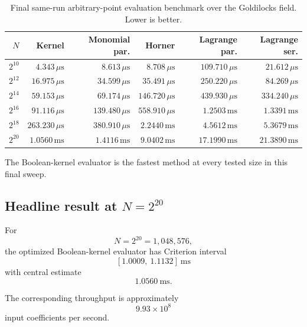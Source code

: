 \begin{table}[ht]
\centering
\small
\begin{tabular}{rrrrrr}
\toprule
\(N\) &
Kernel &
Monomial par. &
Horner &
Lagrange par. &
Lagrange ser. \\
\midrule
\(2^{10}\) &
\(4.343\,\mu\mathrm{s}\) &
\(8.613\,\mu\mathrm{s}\) &
\(8.708\,\mu\mathrm{s}\) &
\(109.710\,\mu\mathrm{s}\) &
\(21.612\,\mu\mathrm{s}\) \\

\(2^{12}\) &
\(16.975\,\mu\mathrm{s}\) &
\(34.599\,\mu\mathrm{s}\) &
\(35.491\,\mu\mathrm{s}\) &
\(250.220\,\mu\mathrm{s}\) &
\(84.269\,\mu\mathrm{s}\) \\

\(2^{14}\) &
\(59.153\,\mu\mathrm{s}\) &
\(69.174\,\mu\mathrm{s}\) &
\(146.720\,\mu\mathrm{s}\) &
\(439.930\,\mu\mathrm{s}\) &
\(334.240\,\mu\mathrm{s}\) \\

\(2^{16}\) &
\(91.116\,\mu\mathrm{s}\) &
\(139.480\,\mu\mathrm{s}\) &
\(558.910\,\mu\mathrm{s}\) &
\(1.2503\,\mathrm{ms}\) &
\(1.3391\,\mathrm{ms}\) \\

\(2^{18}\) &
\(263.230\,\mu\mathrm{s}\) &
\(380.910\,\mu\mathrm{s}\) &
\(2.2440\,\mathrm{ms}\) &
\(4.5612\,\mathrm{ms}\) &
\(5.3679\,\mathrm{ms}\) \\

\(2^{20}\) &
\(1.0560\,\mathrm{ms}\) &
\(1.4116\,\mathrm{ms}\) &
\(9.0402\,\mathrm{ms}\) &
\(17.1990\,\mathrm{ms}\) &
\(21.3890\,\mathrm{ms}\) \\
\bottomrule
\end{tabular}
\caption{Final same-run arbitrary-point evaluation benchmark over the
Goldilocks field. Lower is better.}
\label{tab:final-basis-results}
\end{table}

The Boolean-kernel evaluator is the fastest method at every tested size in
this final sweep.

\subsection{Headline result at \(N=2^{20}\)}

For
\[
N=2^{20}=1{,}048{,}576,
\]
the optimized Boolean-kernel evaluator has Criterion interval
\[
[1.0009,\ 1.1132]\ \mathrm{ms}
\]
with central estimate
\[
\boxed{1.0560\ \mathrm{ms}}.
\]

The corresponding throughput is approximately
\[
\boxed{9.93\times10^8}
\]
input coefficients per second.

